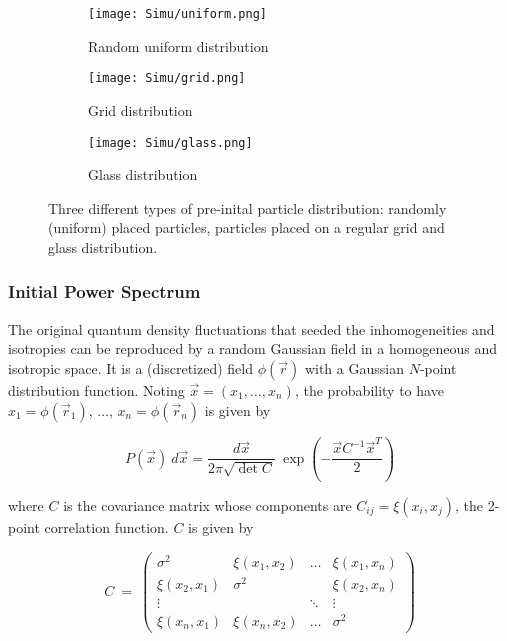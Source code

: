\begin{figure}
\centering
\begin{subfigure}{0.32\textwidth}
\centering
\texttt{[image: Simu/uniform.png]}
\caption{Random uniform distribution}
\end{subfigure}
\hfill
\begin{subfigure}{0.32\textwidth}
\centering
\texttt{[image: Simu/grid.png]}
\caption{Grid distribution}
\end{subfigure}
\hfill
\begin{subfigure}{0.32\textwidth}
\centering
\texttt{[image: Simu/glass.png]}
\caption{Glass distribution}
\end{subfigure}
\caption[Types of pre-initial particles distribution]{Three different types of pre-inital particle distribution: randomly (uniform) placed
particles, particles placed on a regular grid and glass distribution.}\label{fig:preinitial_conditions}
\end{figure}


\subsubsection{Initial Power Spectrum}
\label{sec:ips}

The original quantum density fluctuations that seeded the inhomogeneities and isotropies can be reproduced by a random Gaussian field in a homogeneous and isotropic space. It is a (discretized) field $\phi(\vec{r})$ with a Gaussian $N$-point distribution function. Noting $\vec{x} = \left( x_1, \hdots, x_n \right)$, the probability to have $x_1 = \phi(\vec{r}_1)$, $\hdots$, $x_n = \phi(\vec{r}_n)$ is given by

\begin{equation}
P(\vec{x}) ~d\vec{x} = \frac{d\vec{x}}{2\pi \sqrt{\det C}} ~\exp \left( - \frac{\vec{x} C^{-1} \vec{x}^T}{2} \right)
\end{equation}


where $C$ is the covariance matrix whose components are $C_{ij} = \xi(x_i, x_j)$, the 2-point correlation function. $C$ is given by

\begin{equation}
C ~=~ 
\left(
\begin{matrix}
\sigma^2 & \xi(x_1, x_2) & \hdots & \xi(x_1, x_n) \\
\xi(x_2, x_1) & \sigma^2 & & \xi(x_2, x_n) \\
\vdots & & \ddots & \vdots \\
\xi(x_n, x_1) & \xi(x_n, x_2) & \hdots & \sigma^2
\end{matrix}
\right)
\end{equation} 

